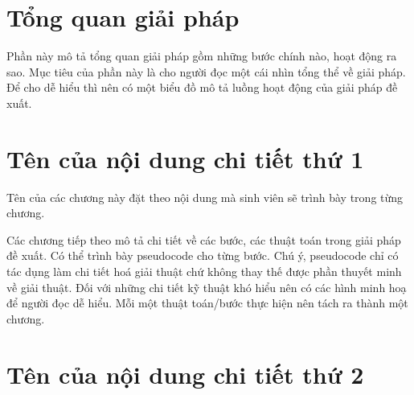\documentclass[../main.tex]{subfiles}
\begin{document}
\section{Tổng quan giải pháp}

Phần này mô tả tổng quan giải pháp gồm những bước chính nào, hoạt động ra sao. Mục tiêu của phần này là cho người đọc một cái nhìn tổng thể về giải pháp. Để cho dễ hiểu thì nên có một biểu đồ mô tả luồng hoạt động của giải pháp đề xuất. 

\section{Tên của nội dung chi tiết thứ 1}
Tên của các chương này đặt theo nội dung mà sinh viên sẽ trình bày trong từng chương. 

Các chương tiếp theo mô tả chi tiết về các bước, các thuật toán trong giải pháp đề xuất. Có thể trình bày pseudocode cho từng bước. Chú ý, pseudocode chỉ có tác dụng làm chi tiết hoá giải thuật chứ không thay thế được phần thuyết minh về giải thuật. Đối với những chi tiết kỹ thuật khó hiểu nên có các hình minh hoạ để người đọc dễ hiểu. Mỗi một thuật toán/bước thực hiện nên tách ra thành một chương. 

\section{Tên của nội dung chi tiết thứ 2}
\end{document}
